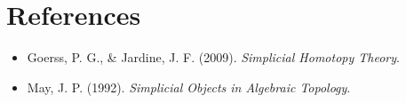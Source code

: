 \documentclass[11pt]{article}
\theoremstyle{definition}
\theoremstyle{plain}
\begin{document}
\section{References}
\begin{itemize}
    \item Goerss, P. G., \& Jardine, J. F. (2009). \emph{Simplicial Homotopy Theory}.
    \item May, J. P. (1992). \emph{Simplicial Objects in Algebraic Topology}.
\end{itemize}
\end{document}
